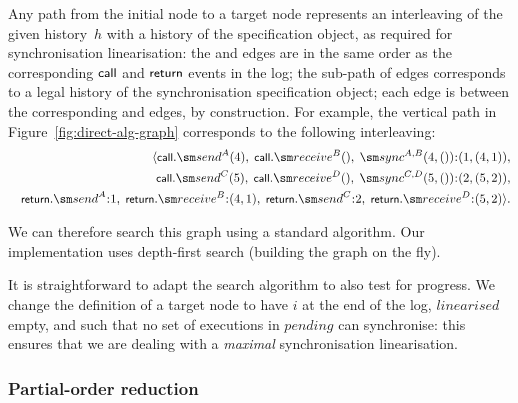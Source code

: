 
Any path from the initial node to a target node represents
an interleaving of the given history~$h$ with a history of the specification
object, as required for synchronisation linearisation: the  and
 edges are in the same order as the corresponding $\mbox{\sf{\small call}}$ and
$\mbox{\sf{\small return}}$ events in the log; the sub-path of  edges
corresponds to a legal history of the synchronisation specification object;
each  edge is between the corresponding
 and  edges, by construction.  For example, the
vertical path in Figure~\ref{fig:direct-alg-graph} corresponds to the
following interleaving:
\[
\begin{align}
\seq{ 
 \call.\send^A(4),\; \call.\receive^B(),\; \sync^{A,B}(4,())\:: (1, (4,1)),\\
\quad \call.\send^C(5),\;  \call.\receive^D(),\; \sync^{C,D}(5,())\:: (2, (5,2)),
 \\
\quad
 \return.\send^A\::1,\; \return.\receive^B\::(4,1),\; \return.\send^C\::2,\;
 \return.\receive^D\:: (5,2) }.
\end{align}
\]

We can therefore search this graph using a standard algorithm.  Our
implementation uses depth-first search (building the graph on the fly).



It is straightforward to adapt the search algorithm to also test for progress.
We change the definition of a target node to have $i$ at the end of
the log, $linearised$ empty, and such that no set of executions in $pending$
can synchronise: this ensures that we are dealing with a \emph{maximal}
synchronisation linearisation.  


\subsubsection{Partial-order reduction}
\label{sec:POR}

